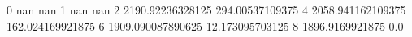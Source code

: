0 nan nan
1 nan nan
2 2190.92236328125 294.00537109375
4 2058.941162109375 162.024169921875
6 1909.090087890625 12.173095703125
8 1896.9169921875 0.0
